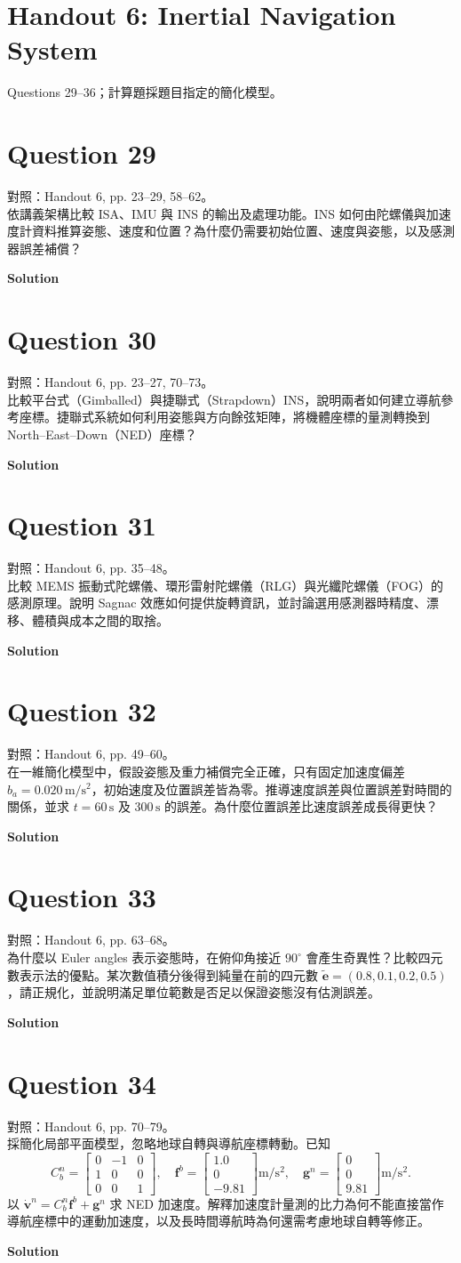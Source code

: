 \documentclass[12pt,a4paper]{article}
\newcommand{\question}[1]{\section*{Question #1}}
\newcommand{\solution}{\par\medskip\textbf{Solution}\par}
\begin{document}
\section*{Handout 6: Inertial Navigation System}
{\small Questions 29--36；計算題採題目指定的簡化模型。}

\question{29}
{\small 對照：Handout 6, pp. 23--29, 58--62。}\\
依講義架構比較 ISA、IMU 與 INS 的輸出及處理功能。INS 如何由陀螺儀與加速度計資料推算姿態、速度和位置？為什麼仍需要初始位置、速度與姿態，以及感測器誤差補償？
\solution
\vfill
\question{30}
{\small 對照：Handout 6, pp. 23--27, 70--73。}\\
比較平台式（Gimballed）與捷聯式（Strapdown）INS，說明兩者如何建立導航參考座標。捷聯式系統如何利用姿態與方向餘弦矩陣，將機體座標的量測轉換到 North--East--Down（NED）座標？
\solution
\vfill
\newpage

\question{31}
{\small 對照：Handout 6, pp. 35--48。}\\
比較 MEMS 振動式陀螺儀、環形雷射陀螺儀（RLG）與光纖陀螺儀（FOG）的感測原理。說明 Sagnac 效應如何提供旋轉資訊，並討論選用感測器時精度、漂移、體積與成本之間的取捨。
\solution
\vfill
\question{32}
{\small 對照：Handout 6, pp. 49--60。}\\
在一維簡化模型中，假設姿態及重力補償完全正確，只有固定加速度偏差 $b_a=0.020\,\mathrm{m/s^2}$，初始速度及位置誤差皆為零。推導速度誤差與位置誤差對時間的關係，並求 $t=60\,\mathrm{s}$ 及 $300\,\mathrm{s}$ 的誤差。為什麼位置誤差比速度誤差成長得更快？
\solution
\vfill
\newpage

\question{33}
{\small 對照：Handout 6, pp. 63--68。}\\
為什麼以 Euler angles 表示姿態時，在俯仰角接近 $90^\circ$ 會產生奇異性？比較四元數表示法的優點。某次數值積分後得到純量在前的四元數 $\tilde{\boldsymbol e}=(0.8,0.1,0.2,0.5)$，請正規化，並說明滿足單位範數是否足以保證姿態沒有估測誤差。
\solution
\vfill
\question{34}
{\small 對照：Handout 6, pp. 70--79。}\\
採簡化局部平面模型，忽略地球自轉與導航座標轉動。已知
\[
 C_b^n=\begin{bmatrix}0&-1&0\\1&0&0\\0&0&1\end{bmatrix},\quad
 \mathbf f^b=\begin{bmatrix}1.0\\0\\-9.81\end{bmatrix}\mathrm{m/s^2},\quad
 \mathbf g^n=\begin{bmatrix}0\\0\\9.81\end{bmatrix}\mathrm{m/s^2}.
\]
以 $\dot{\mathbf v}^n=C_b^n\mathbf f^b+\mathbf g^n$ 求 NED 加速度。解釋加速度計量測的比力為何不能直接當作導航座標中的運動加速度，以及長時間導航時為何還需考慮地球自轉等修正。
\solution
\vfill
\newpage
\end{document}
